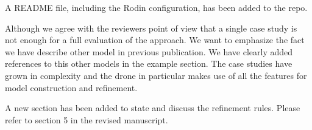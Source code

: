 \documentclass{response}
\begin{document}
\begin{comment}{Reviewer \#1}
  PS Could you put another zip version on the repository: I have had some
strange problems (missing characters) with some machine files? For such
files, I was not able to play again the proofs.
\end{comment}

\begin{response}
A README file, including the Rodin configuration, has been added to the repo.
\end{response}

\begin{comment}{Reviewer \#2}
The paper introduces a technique for the refinement of `run to completion' 
statechart modelling notation (using SCXML language) while preserving safety 
properties. The statechart specification is translated to event-B formalism, 
allowing for formal verification using a theorem prover. The proposed approach 
is demonstrated using a statechart specification of a drone.

Positive points:
+ Interesting topic
+ Technique well motivated
+ The paper is well written and easy to read.

Negative points:
- One single case study is not enough to validate the proposed approach. The 
statechart specification of the drone is rather small. More elaborated models 
are required to validate the proposed approach.
\end{comment}

\begin{response}
Although we agree with the reviewers point of view that a single case study is
not enough for a full evaluation of the approach. We want to emphasize the fact
we have describe other model in previous publication. We have clearly added
references to this other models in the example section. The case studies have
grown in complexity and the drone in particular makes use of all the features
for model construction and refinement.
\end{response}


\begin{comment}{Reviewer \#2}
General comments:
  - The three refinement rules listed in the introduction have not been 
  described explicitly in the rest of the paper. Please describe them (using 
  minimal examples) in section 3.
\end{comment}

\begin{response}
A new section has been added to state and discuss the refinement rules. 
Please refer to section 5 in the revised manuscript.
\end{response}
\end{document}
